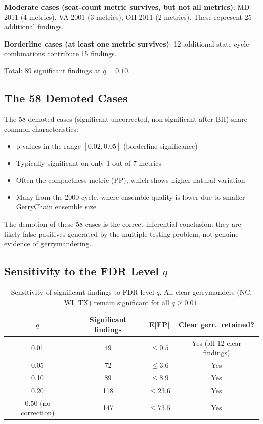 \textbf{Moderate cases (seat-count metric survives, but not all metrics)}:
MD 2011 (4 metrics), VA 2001 (3 metrics), OH 2011 (2 metrics).
These represent 25 additional findings.

\textbf{Borderline cases (at least one metric survives)}:
12 additional state-cycle combinations contribute 15 findings.

Total: 89 significant findings at $q = 0.10$.

\subsection{The 58 Demoted Cases}

The 58 demoted cases (significant uncorrected, non-significant after BH)
share common characteristics:
\begin{itemize}
\item p-values in the range $[0.02, 0.05]$ (borderline significance)
\item Typically significant on only 1 out of 7 metrics
\item Often the compactness metric (PP), which shows higher natural variation
\item Many from the 2000 cycle, where ensemble quality is lower due to
  smaller GerryChain ensemble size
\end{itemize}

The demotion of these 58 cases is the correct inferential conclusion:
they are likely false positives generated by the multiple testing problem,
not genuine evidence of gerrymandering.

\subsection{Sensitivity to the FDR Level $q$}

\begin{table}[h]
\centering
\caption{Sensitivity of significant findings to FDR level $q$.
         All clear gerrymanders (NC, WI, TX) remain significant for all $q \geq 0.01$.}
\label{tab:sensitivity}
\begin{tabular}{cccc}
\toprule
$q$ & Significant findings & E[FP] & Clear gerr.\ retained? \\
\midrule
0.01 & 49 & $\leq 0.5$ & Yes (all 12 clear findings) \\
0.05 & 72 & $\leq 3.6$ & Yes \\
0.10 & 89 & $\leq 8.9$ & Yes \\
0.20 & 118 & $\leq 23.6$ & Yes \\
0.50 (no correction) & 147 & $\leq 73.5$ & Yes \\
\bottomrule
\end{tabular}
\end{table}


